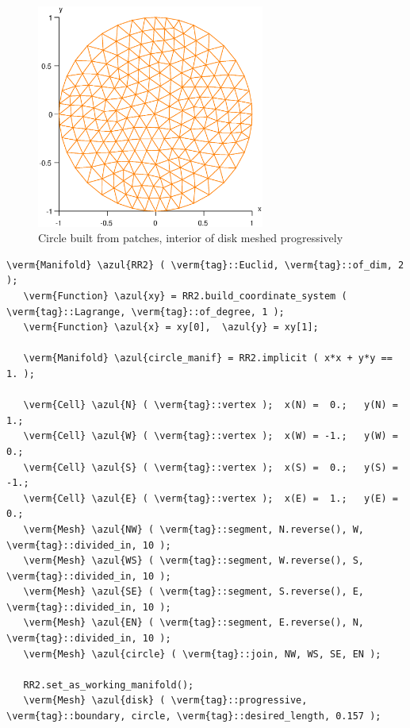 \begin{figure} \centering
 \includegraphics[width=75mm]{disk-with-tri}
 \caption{Circle built from patches, interior of disk meshed progressively}
 \label{\numb section 3.\numb fig 1}
\end{figure}

\begin{Verbatim}[commandchars=\\\{\},formatcom=\small\tt,frame=single,
   label=parag-\ref{\numb section 3.\numb parag 1}.cpp,rulecolor=\color{coment},
   baselinestretch=0.94,framesep=2mm                                            ]
   \verm{Manifold} \azul{RR2} ( \verm{tag}::Euclid, \verm{tag}::of_dim, 2 );
   \verm{Function} \azul{xy} = RR2.build_coordinate_system ( \verm{tag}::Lagrange, \verm{tag}::of_degree, 1 );
   \verm{Function} \azul{x} = xy[0],  \azul{y} = xy[1];
   
   \verm{Manifold} \azul{circle_manif} = RR2.implicit ( x*x + y*y == 1. );
   
   \verm{Cell} \azul{N} ( \verm{tag}::vertex );  x(N) =  0.;   y(N) =  1.;
   \verm{Cell} \azul{W} ( \verm{tag}::vertex );  x(W) = -1.;   y(W) =  0.;
   \verm{Cell} \azul{S} ( \verm{tag}::vertex );  x(S) =  0.;   y(S) = -1.;
   \verm{Cell} \azul{E} ( \verm{tag}::vertex );  x(E) =  1.;   y(E) =  0.;
   \verm{Mesh} \azul{NW} ( \verm{tag}::segment, N.reverse(), W, \verm{tag}::divided_in, 10 );
   \verm{Mesh} \azul{WS} ( \verm{tag}::segment, W.reverse(), S, \verm{tag}::divided_in, 10 );
   \verm{Mesh} \azul{SE} ( \verm{tag}::segment, S.reverse(), E, \verm{tag}::divided_in, 10 );
   \verm{Mesh} \azul{EN} ( \verm{tag}::segment, E.reverse(), N, \verm{tag}::divided_in, 10 );
   \verm{Mesh} \azul{circle} ( \verm{tag}::join, NW, WS, SE, EN );
   
   RR2.set_as_working_manifold();
   \verm{Mesh} \azul{disk} ( \verm{tag}::progressive, \verm{tag}::boundary, circle, \verm{tag}::desired_length, 0.157 );
\end{Verbatim}

